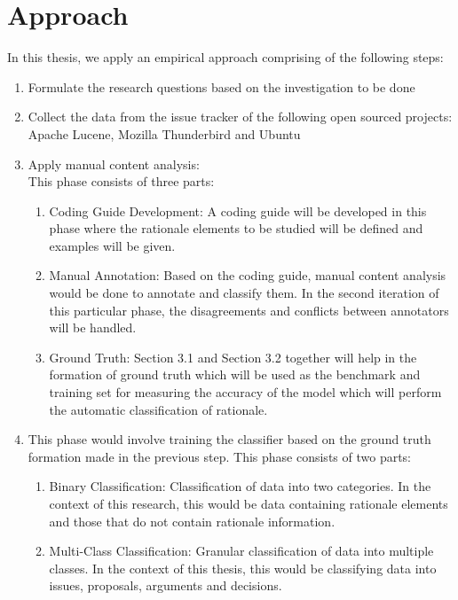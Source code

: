 \documentclass[dvips,12pt]{article}
\begin{document}
\section{Approach}
In this thesis, we apply an empirical approach comprising of the following steps:
\begin{enumerate}
	\item Formulate the research questions based on the investigation to be done
	\item Collect the data from the issue tracker of the following open sourced projects: Apache Lucene, Mozilla Thunderbird and Ubuntu
	\item Apply manual content analysis: \\
	 This phase consists of three parts:
	\begin{enumerate}
		\item Coding Guide Development: A coding guide will be developed in this phase where the rationale elements to be studied will be defined and examples will be given.
		\item Manual Annotation: Based on the coding guide, manual content analysis would be done to annotate and classify them. In the second iteration of this particular phase, the disagreements and conflicts between annotators will be handled. 
		\item Ground Truth: Section 3.1 and Section 3.2 together will help in the formation of ground truth which will be used as the benchmark and training set for measuring the accuracy of the model which will perform the automatic classification of rationale. 	
	\end{enumerate}
	
	\item This phase would involve training the classifier based on the ground truth formation made in the previous step. This phase consists of two parts:
	\begin{enumerate}
		\item Binary Classification:  Classification of data into two categories. In the context of this research, this would be data containing rationale elements and those that do not contain rationale information.
		\item Multi-Class Classification: Granular classification of data into multiple classes. In the context of this thesis, this would be classifying data into issues, proposals, arguments and decisions.
	\end{enumerate}
	
\end{enumerate}
\end{document}
